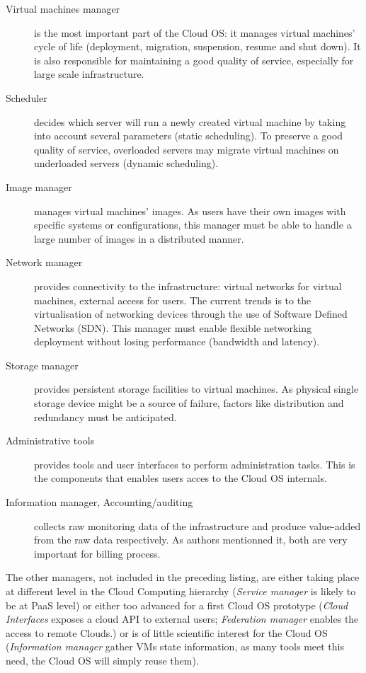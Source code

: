 \begin{description}
	
	\item [Virtual machines manager] is the most important part of the Cloud OS:
	it manages virtual machines' cycle of life (deployment, migration, 
	suspension, resume and shut down). It is also responsible for maintaining
	a good quality of service, especially for large scale infrastructure.

	\item [Scheduler] decides which server will run a newly created virtual 
	machine by taking into account several parameters (static scheduling). To 
	preserve a good quality of service, overloaded servers may migrate virtual
	machines on underloaded servers (dynamic scheduling).

	\item [Image manager] manages virtual machines' images. As users have their
	own images with specific systems or configurations, this manager must be 
	able to handle a large number of images in a distributed manner.

	\item [Network manager] provides connectivity to the infrastructure: virtual
	networks for virtual machines, external access for users. The current trends
	is to the virtualisation of networking devices through the use of Software
	Defined Networks (SDN). This manager must enable flexible networking 
	deployment without losing performance (bandwidth and latency).

	\item [Storage manager] provides persistent storage facilities to virtual 
	machines. As physical single storage device might be a source of failure,
	factors like distribution and redundancy must be anticipated.

	\item [Administrative tools] provides tools and user interfaces to perform
	administration tasks. This is the components that enables users acces to
	the Cloud OS internals.

	\item [Information manager, Accounting/auditing ] collects raw monitoring 
	data of the infrastructure and produce value-added from the raw data 
	respectively. As authors mentionned it, both are very important for billing
	process.

\end{description}

The other managers, not included in the preceding listing, are either taking 
place at different level in the Cloud Computing hierarchy (\emph{Service 
manager} is likely to be at PaaS level) or either too advanced for a first Cloud
OS prototype (\emph{Cloud Interfaces} exposes a cloud API to external users; 
\emph{Federation manager} enables the access to remote Clouds.) or is of little 
scientific interest for the Cloud OS (\emph{Information manager} gather VMs 
state information, as many tools meet this need, the Cloud OS will simply 
reuse them).


